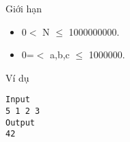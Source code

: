 Giới hạn
\begin{itemize}
	\item     0$<$ N  $\le$ 1000000000.   
	\item     0=$<$ a,b,c  $\le$ 1000000.   
\end{itemize}
Ví dụ
\begin{verbatim}
Input
5 1 2 3
Output
42
\end{verbatim}